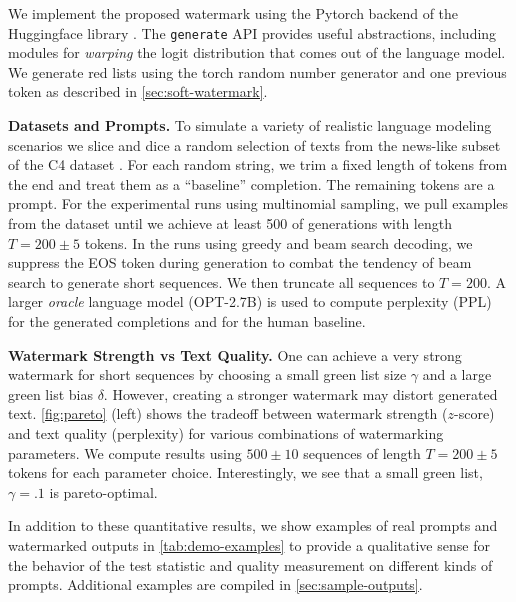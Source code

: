 \documentclass{article}
\theoremstyle{plain}
\theoremstyle{definition}
\theoremstyle{remark}
\begin{document}
We implement the proposed watermark using the Pytorch backend of the Huggingface library \citep{wolf_huggingfaces_2020}. The \texttt{generate} API provides useful abstractions, including modules for \textit{warping} the logit distribution that comes out of the language model. 
We generate red lists using the torch random number generator and one previous token as described in \cref{sec:soft-watermark}. 


 
\textbf{Datasets and Prompts.}
To simulate a variety of realistic language modeling scenarios we slice and dice a random selection of texts from the news-like subset of  the C4 dataset \citep{2019t5}. 
%
For each random string, we trim a fixed length of tokens from the end and treat them as a ``baseline'' completion.  The remaining tokens are a prompt. For the experimental runs using multinomial sampling, we pull examples from the dataset until we achieve at least 500 of generations with length $T=200\pm5$ tokens. In the runs using greedy and beam search decoding, we suppress the EOS token during generation  to combat the tendency of beam search to generate short sequences. We then truncate all sequences to $T=200$.
%
A larger \textit{oracle} language model (OPT-2.7B) is used to compute perplexity (PPL) for the generated completions and for the human baseline. 

\textbf{Watermark Strength vs Text Quality.}
One can achieve a very strong watermark for short sequences by choosing a small green list size $\gamma$ and a large green list bias $\delta.$  However, creating a stronger watermark may distort generated text.  \cref{fig:pareto} (left) shows the tradeoff between watermark strength ($z$-score) and text quality (perplexity) for various combinations of watermarking parameters. We compute results using $500\pm10$ sequences of length $T=200\pm5$ tokens for each parameter choice.  Interestingly, we see that a small green list, $\gamma=.1$ is pareto-optimal. 

In addition to these quantitative results, we show examples of real prompts and watermarked outputs in \cref{tab:demo-examples} to provide a qualitative sense for the behavior of the test statistic and quality measurement on different kinds of prompts. Additional examples are compiled in \cref{sec:sample-outputs}.
\end{document}
